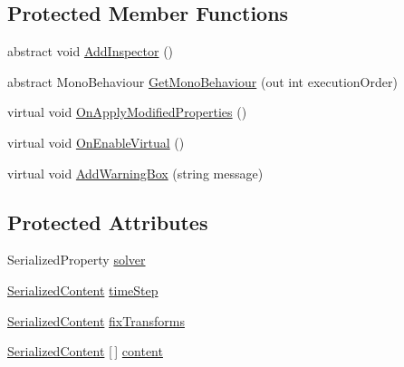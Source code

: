 \subsection*{Protected Member Functions}
\begin{DoxyCompactItemize}
\item 
abstract void \mbox{\hyperlink{class_root_motion_1_1_final_i_k_1_1_i_k_inspector_a6a32ab00e4234074b64acfebb4945153}{Add\+Inspector}} ()
\item 
abstract Mono\+Behaviour \mbox{\hyperlink{class_root_motion_1_1_final_i_k_1_1_i_k_inspector_a4c4528d5f5ce9af9e30c049138a5a5ca}{Get\+Mono\+Behaviour}} (out int execution\+Order)
\item 
virtual void \mbox{\hyperlink{class_root_motion_1_1_final_i_k_1_1_i_k_inspector_a2909376aa17c40b7d7577761165d1c67}{On\+Apply\+Modified\+Properties}} ()
\item 
virtual void \mbox{\hyperlink{class_root_motion_1_1_final_i_k_1_1_i_k_inspector_a462bc6acec264d59597f3c6a211f179f}{On\+Enable\+Virtual}} ()
\item 
virtual void \mbox{\hyperlink{class_root_motion_1_1_final_i_k_1_1_i_k_inspector_aeebe6bda6ad5ac9c1ee0fae830259c3b}{Add\+Warning\+Box}} (string message)
\end{DoxyCompactItemize}
\subsection*{Protected Attributes}
\begin{DoxyCompactItemize}
\item 
Serialized\+Property \mbox{\hyperlink{class_root_motion_1_1_final_i_k_1_1_i_k_inspector_a23d050c4ae7cb036f580a9dc9bc8763b}{solver}}
\item 
\mbox{\hyperlink{struct_root_motion_1_1_serialized_content}{Serialized\+Content}} \mbox{\hyperlink{class_root_motion_1_1_final_i_k_1_1_i_k_inspector_a9740af7bf75f6214f6d2963834f440d5}{time\+Step}}
\item 
\mbox{\hyperlink{struct_root_motion_1_1_serialized_content}{Serialized\+Content}} \mbox{\hyperlink{class_root_motion_1_1_final_i_k_1_1_i_k_inspector_a1602fc96b8299816f6f55de96c6c9396}{fix\+Transforms}}
\item 
\mbox{\hyperlink{struct_root_motion_1_1_serialized_content}{Serialized\+Content}} \mbox{[}$\,$\mbox{]} \mbox{\hyperlink{class_root_motion_1_1_final_i_k_1_1_i_k_inspector_a1031a72559f76bb44e3c7f66a56207b9}{content}}
\end{DoxyCompactItemize}


